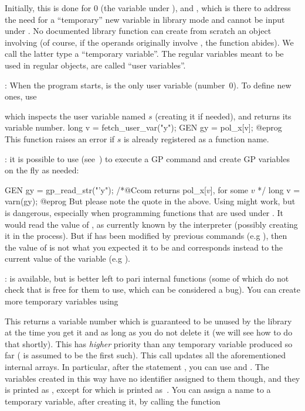 Initially, this is done for $0$ (the variable  under ), and
, which is there to address the need for a ``temporary'' new
variable in library mode and cannot be input under . No documented
library function can create from scratch an object involving 
(of course, if the operands originally involve , the function
abides). We call the latter type a ``temporary variable''. The regular
variables meant to be used in regular objects, are called ``user
variables''.

: When the program starts,
 is the only user variable (number~$0$). To define new ones, use


\noindent which inspects the user variable named $s$ (creating it if needed),
and returns its variable number.
\bprog
long v = fetch_user_var("y");
GEN gy = pol_x[v];
@eprog\noindent
This function raises an error if $s$ is already registered as a function name.

: it is possible to use 
(see~) to execute a GP command and create GP variables
on the fly as needed:

\bprog
GEN gy = gp_read_str("'y"); /*@Ccom returns pol\_x[$v$], for some $v$ */
long v = varn(gy);
@eprog\noindent
But please note the quote  in the above. Using 
might work, but is dangerous, especially when programming functions that are
used under . It would read the value of , as currently known
by the  interpreter (possibly creating it in the process). But if
 has been modified by previous  commands (e.g ),
then the value of  is not what you expected it to be and corresponds
instead to the current value of the  variable (e.g ).

:
 is available, but is better left to pari internal functions
(some of which do not check that  is free for them to use,
which can be considered a bug). You can create more temporary variables
using

\label{se:fetch_var}

\noindent
This returns a variable number which is guaranteed to be unused by the
library at the time you get it and as long as you do not delete it (we will
see how to do that shortly). This has \emph{higher} priority than any
temporary variable produced so far ( is assumed to be the first
such). This call updates all the aforementioned internal arrays. In
particular, after the statement , you can use
 and . The variables created in this way have no
identifier assigned to them though, and they is printed as
, except for  which is printed
as~\kbd{\#}. You can assign a name to a temporary variable, after creating
it, by calling the function

